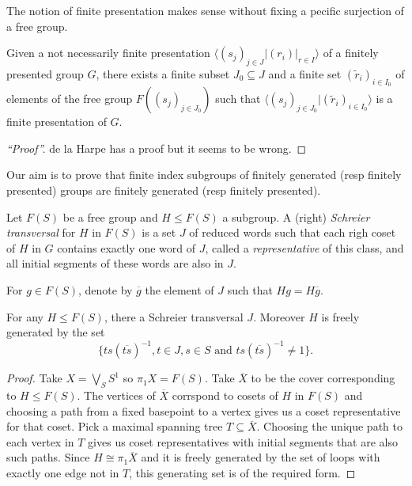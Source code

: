 \documentclass[a4paper]{article}
\begin{document}
The notion of finite presentation makes sense without fixing a pecific surjection of a free group.

\begin{theorem}
  Given a not necessarily finite presentation \(\langle (s_j)_{j \in J} | (r_i)|_{r \in I} \rangle\) of a finitely presented group \(G\), there exists a finite subset \(J_0 \subseteq J\) and a finite set \((\tilde r_i)_{i \in I_0}\) of elements of the free group \(F((s_j)_{j \in J_0})\) such that \(\langle (s_j)_{j \in J_0} | (\tilde r_i)_{i \in I_0} \rangle\) is a finite presentation of \(G\).
\end{theorem}

\begin{proof}[``Proof'']
  de la Harpe has a proof but it seems to be wrong.
\end{proof}

Our aim is to prove that finite index subgroups of finitely generated (resp finitely presented) groups are finitely generated (resp finitely presented).

\begin{definition}
  Let \(F(S)\) be a free group and \(H \leq F(S)\) a subgroup. A (right) \emph{Schreier transversal} for \(H\) in \(F(S)\) is a set \(J\) of reduced words such that each righ coset of \(H\) in \(G\) contains exactly one word of \(J\), called a \emph{representative} of this class, and all initial segments of these words are also in \(J\).

  For \(g \in F(S)\), denote by \(\overline g\) the element of \(J\) such that \(Hg = H \overline g\).
\end{definition}

\begin{theorem}
  For any \(H \leq F(S)\), there a Schreier transversal \(J\). Moreover \(H\) is freely generated by the set
  \[
    \{ts(\overline{ts})^{-1}, t \in J, s \in S \text{ and } ts(\overline{ts})^{-1} \ne 1\}.
  \]
\end{theorem}

\begin{proof}
  Take \(X = \bigvee_S S^1\) so \(\pi_1X = F(S)\). Take \(\overline X\) to be the cover corresponding to \(H \leq F(S)\). The vertices of \(\overline X\) corrspond to cosets of \(H\) in \(F(S)\) and choosing a path from a fixed basepoint to a vertex gives us a coset representative for that coset. Pick a maximal spanning tree \(T \subseteq \overline X\). Choosing the unique path to each vertex in \(T\) gives us coset representatives with initial segments that are also such paths. Since \(H \cong \pi_1\overline X\) and it is freely generated by the set of loops with exactly one edge not in \(T\), this generating set is of the required form.
\end{proof}
\end{document}
